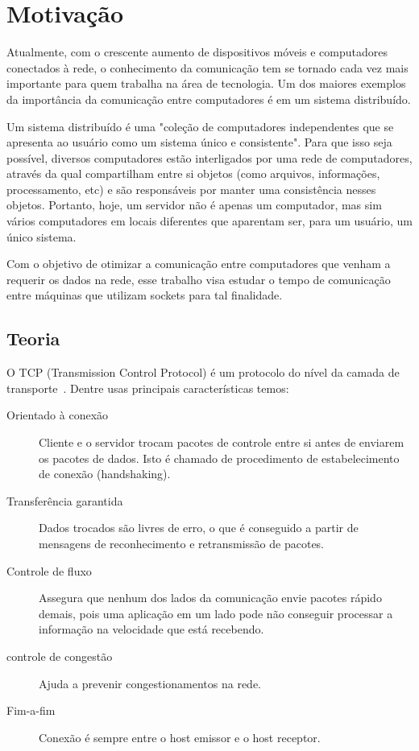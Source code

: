 \documentclass[10pt,a4paper]{article}
\begin{document}
\section{Motivação}
Atualmente, com o crescente aumento de dispositivos móveis e computadores conectados à rede, o conhecimento da comunicação tem se tornado cada vez mais importante para quem trabalha na área de tecnologia. Um dos maiores exemplos da importância da comunicação entre computadores é em um sistema distribuído.

Um sistema distribuído é uma "coleção de computadores independentes que se apresenta ao usuário como um sistema único e consistente"\cite{AST}. Para que isso seja possível, diversos computadores estão interligados por uma rede de computadores, através da qual compartilham entre si objetos (como arquivos, informações, processamento, etc) e são responsáveis por manter uma consistência nesses objetos. 
Portanto, hoje, um servidor não é apenas um computador, mas sim vários
computadores em locais diferentes que aparentam ser, para um usuário,
um único sistema.

Com o objetivo de otimizar a comunicação entre computadores que venham
a requerir os dados na rede, esse trabalho visa estudar o tempo de
comunicação entre máquinas que utilizam sockets para tal finalidade.

\subsection{Teoria}
O TCP (Transmission Control Protocol) é um protocolo do nível da
camada de transporte~\cite{Kurose05}. Dentre usas principais características temos:
\begin{description}
\item[Orientado à conexão]  Cliente e o servidor trocam pacotes de
  controle entre si antes de enviarem os pacotes de dados. Isto é chamado de procedimento de
  estabelecimento de conexão (handshaking). 
\item[Transferência garantida] Dados trocados são livres de erro, o que é conseguido a partir de
  mensagens de reconhecimento e retransmissão de pacotes. 
\item[Controle de fluxo] Assegura que nenhum dos lados da comunicação envie pacotes rápido demais, pois uma aplicação em um
  lado pode não conseguir processar a informação na velocidade que está
  recebendo.
\item[controle de congestão] Ajuda a prevenir congestionamentos na
  rede.
\item[Fim-a-fim ] Conexão é sempre entre o host emissor e o host receptor.

\end{description}
\end{document}
